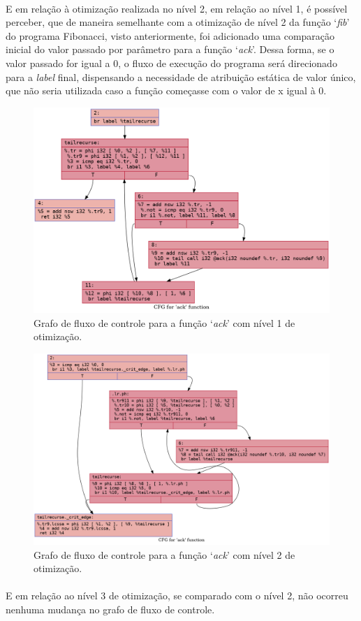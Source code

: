 \documentclass[12pt]{article}
\begin{document}
\paragraph{}E em relação à otimização realizada no nível 2, em relação ao nível 1, é possível perceber, que de maneira semelhante com a otimização de nível 2 da função ‘\textit{fib}’ do programa Fibonacci, visto anteriormente, foi adicionado uma comparação inicial do valor passado por parâmetro para a função ‘\textit{ack}’. Dessa forma, se o valor passado for igual a 0, o fluxo de execução do programa será direcionado para a \textit{label} final, dispensando a necessidade de atribuição estática de valor único, que não seria utilizada caso a função começasse com o valor de x igual à 0.

\begin{figure}
    \centering
    \includegraphics[width=0.5\linewidth]{recursive_.ack_O1.png}
    \caption{Grafo de fluxo de controle para a função ‘\textit{ack}’ com nível 1 de otimização.}
\end{figure}

\begin{figure}
    \centering
    \includegraphics[width=0.5\linewidth]{recursive_.ack_O2.png}
    \caption{Grafo de fluxo de controle para a função ‘\textit{ack}’ com nível 2 de otimização.}
\end{figure}

\paragraph{}E em relação ao nível 3 de otimização, se comparado com o nível 2, não ocorreu nenhuma mudança no grafo de fluxo de controle.
\end{document}
